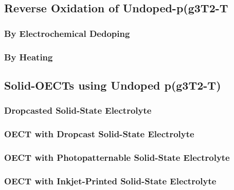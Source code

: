 \subsection{Reverse Oxidation of Undoped-p(g3T2-T}

\subsubsection{By Electrochemical Dedoping}

\subsubsection{By Heating}


\subsection{Solid-OECTs using Undoped p(g3T2-T)}




\subsubsection{Dropcasted Solid-State Electrolyte}

\subsubsection{OECT with Dropcast Solid-State Electrolyte}

\subsubsection{OECT with Photopatternable Solid-State Electrolyte}

\subsubsection{OECT with Inkjet-Printed Solid-State Electrolyte}


